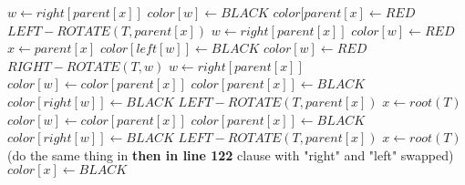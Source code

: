 \documentclass[11pt]{article}
\begin{document}
\begin{algorithm}[h]
\begin{algorithmic}[1]

\State $w \gets right[parent[x]]$
\State $color[w] \gets BLACK$
\State $color[parent[x] \gets RED$
\State $LEFT-ROTATE(T,parent[x])$
\State $w \gets right[parent[x]]$
\EndIf
{}
\State $color[w] \gets RED$
\State $ x \gets parent[x]$
\State $color[left[w]] \gets BLACK$
\State $color[w] \gets RED$
\State $ RIGHT-ROTATE(T,w)$
\State $w \gets right[parent[x]]$
\State $color[w] \gets color[parent[x]]$
\State $color[parent[x]] \gets BLACK$
\State $color[right[w]] \gets BLACK$
\State $LEFT-ROTATE(T,parent[x])$
\State $x \gets root(T)$
\Else {}
\State $color[w] \gets color[parent[x]]$
\State $color[parent[x]] \gets BLACK$
\State $color[right[w]] \gets BLACK$
\State $LEFT-ROTATE(T,parent[x])$
\State $x \gets root(T)$
\EndIf
\Else
\State (do the same thing in \textbf{then in line 122} clause with "right" and "left" swapped) 
\EndIf
\EndWhile
\State $color[x] \gets BLACK$
\EndProcedure
\\


\end{algorithmic}
\end{algorithm}
\end{document}
